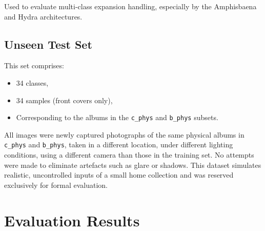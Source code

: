 \begin{uomappendix}
                Used to evaluate multi-class expansion handling, especially by the Amphisbaena and Hydra architectures.
    
            \subsection{Unseen Test Set}\label{data:trueTest}
    
                This set comprises:
                \begin{itemize}
                    \item 34 classes,
                    \item 34 samples (front covers only),
                    \item Corresponding to the albums in the \texttt{c\_phys} and \texttt{b\_phys} subsets.
                \end{itemize}
    
                All images were newly captured photographs of the same physical albums in \texttt{c\_phys} and \texttt{b\_phys}, taken in a different location, under different lighting conditions, using a different camera than those in the training set. No attempts were made to eliminate artefacts such as glare or shadows. This dataset simulates realistic, uncontrolled inputs of a small home collection and was reserved exclusively for formal evaluation.
    
        \section{Evaluation Results}
    

\end{uomappendix}
